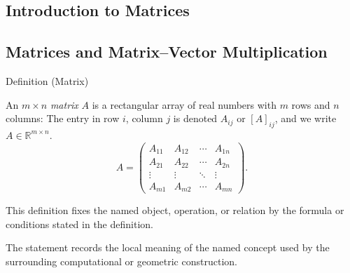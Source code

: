 
\subsection{Introduction to Matrices}

\subsection*{Matrices and Matrix--Vector Multiplication}

\begin{definitionbox}{Definition (Matrix)}
\begin{definition}[Matrix]
\label{def:matrix-array}
An $m \times n$ \emph{matrix} $A$ is a rectangular array of real numbers with
$m$ rows and $n$ columns:
The entry in row $i$, column $j$ is denoted $A_{ij}$ or $[A]_{ij}$, and
we write $A \in \mathbb{R}^{m \times n}$.
\[
  A = \begin{pmatrix}
    A_{11} & A_{12} & \cdots & A_{1n} \\
    A_{21} & A_{22} & \cdots & A_{2n} \\
    \vdots & \vdots & \ddots & \vdots \\
    A_{m1} & A_{m2} & \cdots & A_{mn}
  \end{pmatrix}.
\]
\end{definition}
\end{definitionbox}
\begin{remark*}
This definition fixes the named object, operation, or relation by the formula
or conditions stated in the definition.
\end{remark*}

\begin{remark*}[Interpretation]
The statement records the local meaning of the named concept used by the
surrounding computational or geometric construction.
\end{remark*}

\DefinitionalRoot


